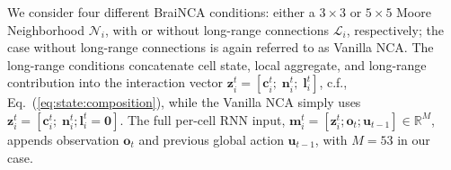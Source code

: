 \documentclass[letterpaper]{article}
\newcommand{\bh}[1]{{\color{black}#1}}  %
\begin{document}
\bh{We consider four different BraiNCA conditions: either a $3\times3$ or $5\times5$ Moore Neighborhood $\mathcal{N}_i$, with or without long-range connections $\mathcal{L}_i$, respectively; 
the case without long-range connections is again referred to as Vanilla NCA. The long-range}
conditions concatenate cell state, local aggregate, and long-range contribution into \bh{the interaction}
vector
\bh{$\mathbf{z}_i^t=[\mathbf{c}_i^t;\; \mathbf{n}_i^t;\; \mathbf{l}_i^t]$, c.f., Eq.~(\ref{eq:state:composition}), while the Vanilla NCA simply uses $\mathbf{z}_i^t= [\mathbf{c}_i^t;\; \mathbf{n}_i^t; \mathbf{l}_i^t=\mathbf{0}]$.}
%
The full per-cell RNN input\bh{, $\mathbf{m}_i^t=[\mathbf{z}_i^t; \mathbf{o}_t; \mathbf{u}_{t-1}]\in\mathbb{R}^M$,} appends observation \bh{$\mathbf{o}_t$} %
and previous global action \bh{$\mathbf{u}_{t-1}$, with $M=53$ in our case.} 
\end{document}
